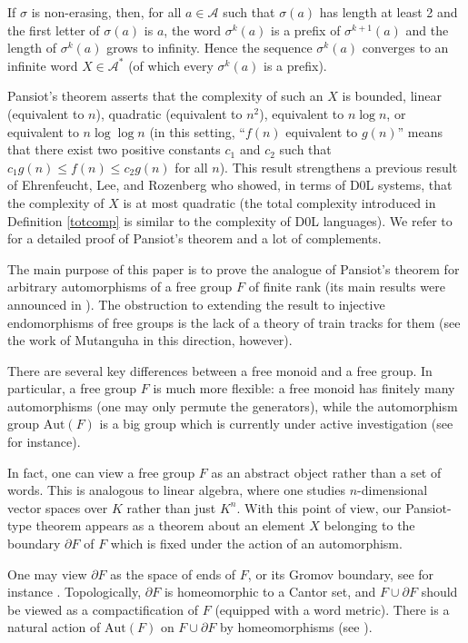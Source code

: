 \documentclass[11pt]{amsart}
\theoremstyle{remark}
\newcommand{\Aut} {{\mathrm{Aut}}}
\newcommand{\bo}{\partial}
\begin{document}
If $\sigma$ is non-erasing, then, for all $a\in\mathcal A$ such that $\sigma(a)$ has length at least 2 and the first letter of $\sigma(a)$ is $a$, 
the word $\sigma^k(a)$ is a prefix of $\sigma^{k+1}(a)$ and the length of $\sigma^k(a)$   grows to infinity.
Hence the sequence $\sigma^k(a)$ converges to an infinite word $X\in\mathcal A^*$ (of which every $\sigma^k(a)$ is a prefix). 

Pansiot's theorem asserts that the complexity of such an $X$ is bounded, linear (equivalent to $n$), quadratic (equivalent to $n^2$), equivalent to $n\log n$, or equivalent to $n\log \log n$ 
(in this setting, ``$f(n)$ equivalent to $g(n)$'' means that there exist two positive constants $c_1$ and $c_2$ such that  
$c_1g(n) \leq f(n) \leq c_2 g(n)$  for all $n$).
This result strengthens   
a previous result of  Ehrenfeucht, Lee, and Rozenberg \cite{Ehrenfeucht-Lee-Rozenberg} who showed,  in terms of D0L systems,  that the complexity of $X$ is at most quadratic (the total complexity introduced in Definition \ref{totcomp} is similar to the complexity of D0L languages).
We refer to \cite{Cassaigne-Nicolas-in-CANT} for a detailed proof of Pansiot's theorem and a lot of complements.


 The main purpose of this paper is to prove the analogue of Pansiot's theorem for  arbitrary automorphisms of a free  group  $F$ of finite rank (its main results were announced in \cite{turku}). 
The obstruction to  extending the result to injective endomorphisms of free groups is the lack of a theory of train tracks for them (see the work of Mutanguha \cite{Mut} in this direction, however).


 
 There are several key differences between a free monoid and a free group. In particular, a free group $F$ is much more flexible: a free monoid   has finitely many automorphisms (one may only permute the generators), while the automorphism group $\Aut(F)$ is a big group which is currently under active investigation (see \cite{vogicm} for instance). 
  
  
 In fact, one can view a free group $F$ as an abstract object rather than a set of words. This is analogous to linear algebra, where one  studies $n$-dimensional vector spaces over $K$ rather than just $K^n$.  With this point of view, our Pansiot-type theorem appears as a theorem about an element $X$ belonging to  the boundary $\bo F$ of $F$   which is fixed under the action of an automorphism.
 
  One may view $\bo F$ as the space of ends of $F$, or its Gromov boundary,    see for instance 
    \cite{BridHa,cooper,  GH,Loh}. 
  Topologically, $\bo F$ is  
homeomorphic to 
a Cantor set, and $F\cup\bo F$ should be viewed as a compactification of $F$ (equipped with a word metric).
 There is a natural   action of $\Aut(F)$ on $F\cup\bo F$ by homeomorphisms   (see \cite{cooper}).
\end{document}
